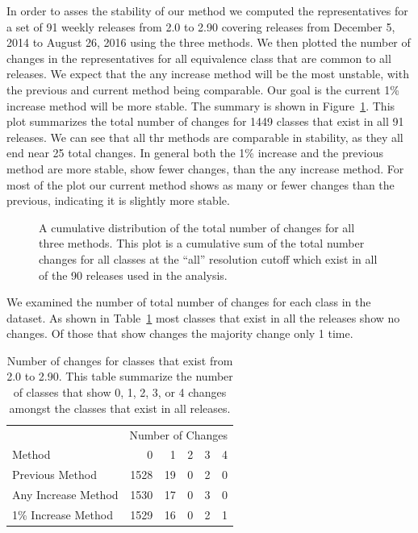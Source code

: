 In order to asses the stability of our method we computed the representatives
for a set of 91 weekly releases from 2.0 to 2.90 covering releases from December
5, 2014 to August 26, 2016 using the three methods. We then plotted the number
of changes in the representatives for all equivalence class that are common to
all releases. We expect that the any increase method will be the most unstable,
with the previous and current method being comparable. Our goal is the current
1\% increase method will be more stable. The summary is shown in
Figure~\ref{fig:rep-changes}. This plot summarizes the total number of changes
for 1449 classes that exist in all 91 releases. We can see that all thr%
methods are comparable in stability, as they all end near 25 total changes. In
general both the 1\% increase and the previous method are more stable, show fewer
changes, than the any increase method. For most of the plot our current method
shows as many or fewer changes than the previous, indicating it is slightly more
stable.

\begin{figure}
  \caption{A cumulative distribution of the total number of changes for all
    three methods. This plot is a cumulative sum of the total number changes for
    all classes at the ``all'' resolution cutoff which exist in all of the 90
  releases used in the analysis.}
  \label{fig:rep-changes}
\end{figure}

We examined the number of total number of changes for each class in the dataset.
As shown in Table~\ref{tab:rep-changes-count} most classes that exist in all the
releases show no changes. Of those that show changes the majority change only 1
time.

\begin{table}
  \begin{tabular}{lrrrrr}
    \toprule
                        & \multicolumn{5}{c}{Number of Changes} \\
    Method              & 0    & 1  &  2 &  3 &  4 \\
    \midrule
    Previous Method     & 1528 & 19 &  0 &  2 &  0 \\
    Any Increase Method & 1530 & 17 &  0 &  3 &  0 \\
    1\% Increase Method & 1529 & 16 &  0 &  2 &  1 \\
    \bottomrule
  \end{tabular}
  \caption{Number of changes for classes that exist from 2.0 to 2.90. This table
    summarize the number of classes that show 0, 1, 2, 3, or 4 changes amongst
  the classes that exist in all releases. }
  \label{tab:rep-changes-count}
\end{table}

